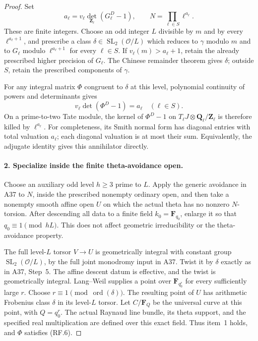 \begin{proof}
Set
\[
 a_\ell=v_\ell\det_{\mathbf Z_\ell}(G_\ell^D-1),
 \qquad N=\prod_{\ell\in S}\ell^{a_\ell}.                  \tag{RF.5}
\]
These are finite integers.  Choose an odd integer $L$ divisible
by $m$ and by every $\ell^{a_\ell+1}$, and prescribe a class
$\delta\in\operatorname{SL}_2(\mathcal O/L)$ which reduces to
$\gamma$ modulo $m$ and to $G_\ell$ modulo
$\ell^{a_\ell+1}$ for every $\ell\in S$.  If
$v_\ell(m)>a_\ell+1$, retain the already prescribed higher
precision of $G_\ell$.  The Chinese remainder theorem gives
$\delta$; outside $S$, retain the prescribed components of
$\gamma$.

For any integral matrix $\Phi$ congruent to $\delta$ at this
level, polynomial continuity of powers and determinants gives
\[
 v_\ell\det(\Phi^D-1)=a_\ell\quad(\ell\in S).              \tag{RF.6}
\]
On a prime-to-two Tate module, the kernel of $\Phi^D-1$ on
$T_\ell J\otimes\mathbf Q_\ell/\mathbf Z_\ell$ is therefore
killed by $\ell^{a_\ell}$.  For completeness, its Smith normal
form has diagonal entries with total valuation $a_\ell$;
each diagonal valuation is at most their sum.  Equivalently,
the adjugate identity gives this annihilator directly.

\paragraph{2. Specialize inside the finite theta-avoidance open.}
Choose an auxiliary odd level $h\geq3$ prime to $L$.
Apply the generic avoidance in A37 to $N$, inside the prescribed
nonempty ordinary open, and then take a nonempty smooth affine
open $U$ on which the actual theta has no nonzero $N$-torsion.
After descending all data to a finite field
$k_0=\mathbf F_{q_0}$, enlarge it so that
$q_0\equiv1\pmod{hL}$.  This does not affect geometric
irreducibility or the theta-avoidance property.

The full level-$L$ torsor $V\to U$ is geometrically integral
with constant group $\operatorname{SL}_2(\mathcal O/L)$, by
the full joint monodromy input in A37.  Twist it by $\delta$
exactly as in A37, Step~5.  The affine descent datum is effective,
and the twist is geometrically integral.  Lang--Weil supplies a
point over $\mathbf F_{q_0^r}$ for every sufficiently large $r$.
Choose $r\equiv1\pmod{\operatorname{ord}(\delta)}$.
The resulting point of $U$ has arithmetic Frobenius class
$\delta$ in its level-$L$ torsor.  Let $C/\mathbf F_Q$ be
the universal curve at this point, with $Q=q_0^r$.
The actual Raynaud line bundle, its theta support, and the
specified real multiplication are defined over this exact field.
Thus item~1 holds, and $\Phi$ satisfies (RF.6).


\end{proof}
